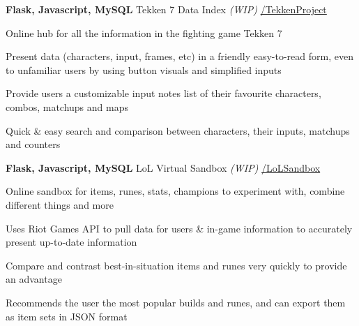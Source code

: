
\begin{cventries}

  \cventry
    {\textbf{Flask, Javascript, MySQL}} %
    {Tekken 7 Data Index \textit{(WIP)}} %
    {\href{https://github.com/basulaib/TekkenProject}{\faGithub /TekkenProject}} %
    {} %
    {
      \begin{cvitems} %
        \item {Online hub for all the information in the fighting game Tekken 7}
        \item {Present data (characters, input, frames, etc) in a friendly easy-to-read form, even to unfamiliar users by using button visuals and simplified inputs}
        \item {Provide users a customizable input notes list of their favourite characters, combos, matchups and maps}
        \item {Quick \& easy search and comparison between characters, their inputs, matchups and counters}
      \end{cvitems}
    }
    
  \cventry
    {\textbf{Flask, Javascript, MySQL}} %
    {LoL Virtual Sandbox \textit{(WIP)}} %
    {\href{https://github.com/basulaib/LoLSandbox}{\faGithub /LoLSandbox}} %
    {} %
    {
      \begin{cvitems} %
        \item {Online sandbox for items, runes, stats, champions to experiment with, combine different things and more}
        \item {Uses Riot Games API to pull data for users \& in-game information to accurately present up-to-date information}
        \item {Compare and contrast best-in-situation items and runes very quickly to provide an advantage}
        \item {Recommends the user the most popular builds and runes, and can export them as item sets in JSON format}
      \end{cvitems}
    }


\end{cventries}
